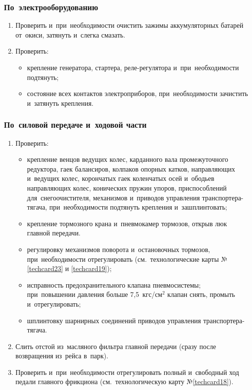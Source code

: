 \subsubsection{По~электрооборудованию}
\begin{enumerate}
    \item Проверить и~при~необходимости очистить зажимы аккумуляторных батарей от~окиси, затянуть и~слегка смазать.
    \item Проверить: 
    \begin{itemize}
        \item крепление генератора, стартера, реле-регулятора и~при~необходимости подтянуть; 
        \item состояние всех контактов электроприборов, при~необходимости зачистить и~затянуть крепления. 
    \end{itemize}
\end{enumerate}

\subsubsection{По~силовой передаче и~ходовой части}
\begin{enumerate}
    \item Проверить: 
        \begin{itemize}
            \item крепление венцов ведущих колес, карданного вала промежуточного редуктора, гаек балансиров, колпаков опорных катков, направляющих и~ведущих колес, корончатых гаек коленчатых осей и~ободьев направляющих колес, конических пружин упоров, приспособлений для~снегоочистителя, механизмов и~приводов управления транспортера-тягача, при~необходимости подтянуть крепления и~зашплинтовать; 
            \item крепление тормозного крана и~пневмокамер тормозов, открыв люк главной передачи. 
            \item регулировку механизмов поворота и~остановочных тормозов, при~необходимости отрегулировать (см.~технологические карты №\ref{techcard23} и \ref{techcard19}); 
            \item исправность предохранительного клапана пневмосистемы; при~повышении давления больше 7,5~кгс/см$^2$ клапан снять, промыть и~отрегулировать; 
            \item шплинтовку шарнирных соединений приводов управления транспортера-тягача. 
        \end{itemize}
    \item Слить отстой из~масляного фильтра главной передачи (сразу после возвращения из~рейса в~парк). 
    \item Проверить и~при~необходимости отрегулировать полный и~свободный ход педали главного фрикциона (см.~технологическую карту №\ref{techcard18}).
\end{enumerate}

